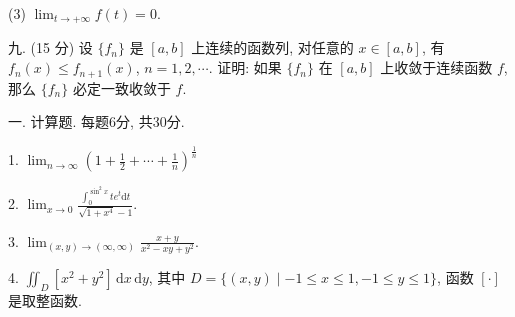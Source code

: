 \documentclass{examcollection}
\begin{document}
{\begin{minipage}{\textwidth}
(3)  $\lim_{t\to+\infty}f(t)=0.$\par
九. (15 分) 设 $\{f_n\}$ 是 $[a, b]$ 上连续的函数列, 对任意的 $x \in [a, b]$, 有 $f_n(x) \leq f_{n+1}(x)$, $n = 1, 2, \cdots$. 证明: 如果 $\{f_n\}$ 在 $[a, b]$ 上收敛于连续函数 $f$, 那么 $\{f_n\}$ 必定一致收敛于 $f$.\par
{}\smallskip
一. 计算题. 每题6分, 共30分.\par
1.  $\lim_{n\to\infty}\left(1+\frac{1}{2}+\cdots+\frac{1}{n}\right)^{\frac{1}{n}}$\par
2. $\lim_{x\to 0}\frac{\int_0^{\sin^2x}te^t\mathrm{d}t}{\sqrt{1 + x^4} - 1}.$\par
3. $\lim_{(x,y)\to (\infty ,\infty)}\frac{x + y}{x^2 - xy + y^2}.$\par
4. $\iint_{D} [x^{2} + y^{2}] \, \mathrm{d}x \, \mathrm{d}y$, 其中 $D = \{(x, y) \mid -1 \leq x \leq 1, -1 \leq y \leq 1\}$, 函数 $[\cdot]$ 是取整函数.\par
\end{minipage}}
\ifdim\dimexpr\ht\proofbox+\dp\proofbox\relax>\textheight
\noindent\resizebox{!}{\textheight}{\usebox{\proofbox}}\else\noindent\usebox{\proofbox}\fi\clearpage
\end{document}
